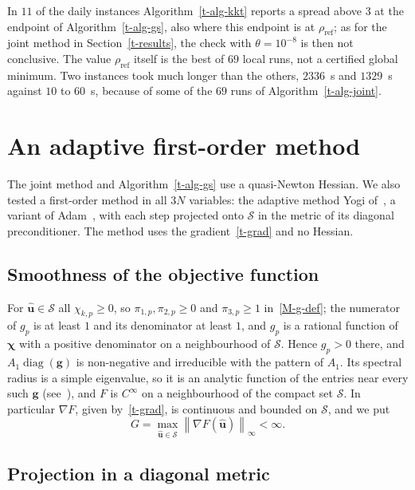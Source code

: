 \documentclass[11pt]{article}
\theoremstyle{plain}
\theoremstyle{remark}
\numberwithin{equation}{section}
\begin{document}
In $11$ of the daily instances Algorithm~\ref{t-alg-kkt} reports a spread above
$3$ at the endpoint of Algorithm~\ref{t-alg-gs}, also where this endpoint is
at $\rho_{\mathrm{ref}}$; as for the joint method in Section~\ref{t-results},
the check with $\theta=10^{-8}$ is then not conclusive. The value
$\rho_{\mathrm{ref}}$ itself is the best of $69$ local runs, not a certified
global minimum. Two instances took much longer than the others,
$2336$~s and $1329$~s against $10$ to $60$~s, because of some of the $69$ runs
of Algorithm~\ref{t-alg-joint}.

\section{An adaptive first-order method}\label{t-yogi}

The joint method and Algorithm~\ref{t-alg-gs} use a quasi-Newton Hessian. We
also tested a first-order method in all $3N$ variables: the adaptive method
Yogi of~\cite{2018Zaheer_Yogi}, a variant of Adam~\cite{2015Kingma_Ba}, with
each step projected onto $\mathcal{S}$ in the metric of its diagonal
preconditioner. The method uses the gradient~\eqref{t-grad} and no Hessian.

\subsection{Smoothness of the objective function}

For $\widehat{\bm u}\in\mathcal{S}$ all $\chi_{k,p}\ge 0$, so
$\pi_{1,p},\pi_{2,p}\ge 0$ and $\pi_{3,p}\ge 1$ in~\eqref{M-g-def}; the
numerator of $g_p$ is at least $1$ and its denominator at least $1$, and $g_p$
is a rational function of $\bm\chi$ with a positive denominator on a
neighbourhood of $\mathcal{S}$. Hence $g_p>0$ there, and
$A_1\operatorname{diag}(\bm g)$ is non-negative and irreducible with the
pattern of $A_1$. Its spectral radius is a simple eigenvalue, so it is an
analytic function of the entries near every such $\bm g$
(see~\cite[Section 6.3]{1985Horn_Johnson}), and $F$ is $C^\infty$ on a
neighbourhood of the compact set $\mathcal{S}$. In particular $\nabla F$,
given by~\eqref{t-grad}, is continuous and bounded on $\mathcal{S}$, and we
put
\begin{equation}\label{t-G}
G=\max_{\widehat{\bm u}\in\mathcal{S}}\left\|\nabla F\left(\widehat{\bm u}\right)\right\|_\infty<\infty .
\end{equation}

\subsection{Projection in a diagonal metric}
\end{document}
